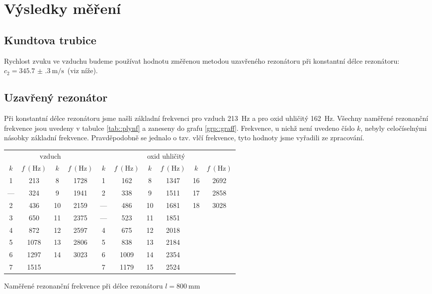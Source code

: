 \section*{Výsledky měření}
\subsection*{Kundtova trubice}
Rychlost zvuku ve vzduchu budeme používat hodnotu změřenou metodou uzavřeného rezonátoru při konstantní délce rezonátoru: $c_2 = \SI{345.7(3)}{\m\per\s}$~(viz níže).























\subsection*{Uzavřený rezonátor}
Při konstantní délce rezonátoru jsme našli základní frekvenci pro vzduch \SI{213}{\Hz} a pro oxid uhličitý \SI{162}{\Hz}.
Všechny naměřené rezonanční frekvence jsou uvedeny v tabulce \ref{tab::plynf} a zaneseny do grafu \ref{grp::graff}.
Frekvence, u nichž není uvedeno číslo $k$, nebyly celočíselnými násobky základní frekvence.
Pravděpodobně se jednalo o tzv. vlčí frekvence, tyto hodnoty jsme vyřadili ze zpracování.


\begin{tabulka}[htbp]
\centering
\begin{tabular}{cc|cc||cc|cc|cc}
\multicolumn{4}{c||}{vzduch} & \multicolumn{6}{c}{oxid uhličitý} \\
$k$ & $f~(\si{\Hz})$ & $k$ & $f~(\si{\Hz})$ & $k$ & $f~(\si{\Hz})$ & $k$ & $f~(\si{\Hz})$ & $k$ & $f~(\si{\Hz})$\\ \hline
1 & 213 & 8 & 1728 & 1 & 162 & 8 & 1347 & 16 & 2692 \\
--- & 324 & 9 & 1941 & 2 & 338 & 9 & 1511 & 17 & 2858 \\
2 & 436 & 10 & 2159 & --- & 486 & 10 & 1681 & 18 & 3028 \\
3 & 650 & 11 & 2375 & --- & 523 & 11 & 1851 & & \\
4 & 872 & 12 & 2597 & 4 & 675 & 12 & 2018 & & \\
5 & 1078 & 13 & 2806 & 5 & 838 & 13 & 2184 & & \\
6 & 1297 & 14 & 3023 & 6 & 1009 & 14 & 2354 & & \\
7 & 1515 & & & 7 & 1179 & 15 & 2524 & & \\
\end{tabular}
\caption{Naměřené rezonanční frekvence při délce rezonátoru $l=\SI{800}{\mm}$}
\label{tab::plynf}
\end{tabulka}

